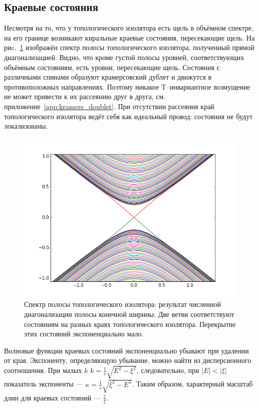 \subsection{Краевые состояния}
Несмотря на то, что у топологического изолятора есть щель в объёмном спектре,
на его границе возникают киральные
краевые состояния, пересекающие щель. На риc.~\ref{fig:edge_states_spectrum} изображён спектр
полосы топологического изолятора, полученный прямой диагонализацией. Видно, что кроме густой
полосы уровней, соответствующих объёмным состояниям, есть уровни, пересекающие щель.
Состояния с различными спинами образуют крамерсовский дублет и
движутся в противоположных направлениях. Поэтому никакое T--инвариантное возмущение не может
привести к их рассеянию друг в друга, см. приложение~\ref{app:kramers_doublet}. 
При отсутствии рассеяния край топологического изолятора
ведёт себя как идеальный провод: состояния не будут локализованы.

\begin{figure}[h]
    \centering
    \includegraphics[width=0.6\linewidth]{edge_states.png}
    \caption{Спектр полосы топологического изолятора: 
             результат численной диагонализации полосы конечной ширины. 
             Две ветви соответствуют состояниям на разных краях топологического изолятора.
             Перекрытие этих состояний экспоненциально мало.}
    \label{fig:edge_states_spectrum}
\end{figure}

Волновые функции краевых состояний экспоненциально убывают при удалении от края. Экспоненту,
определяющую убывание, можно найти из дисперсионного соотношения. При малых $k$ 
$k = \frac{1}{v}\sqrt{E^2 - \xi^2}$, следовательно, при $|E| < |\xi|$ показатель экспоненты ---
$\kappa = \frac{1}{v}\sqrt{\xi^2 - E^2}$. Таким образом, характерный масштаб длин для
краевых состояний --- $\frac{v}{\xi}$.

